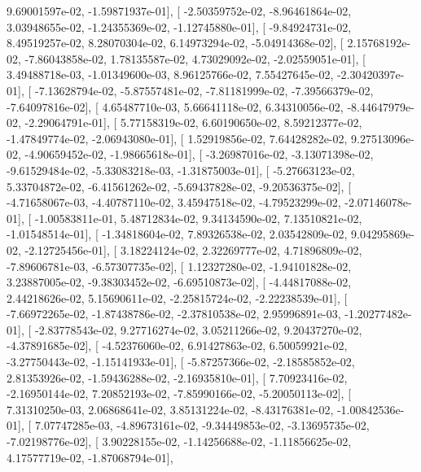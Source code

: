 \documentclass{article}
\begin{document}
          9.69001597e-02,  -1.59871937e-01],
       [ -2.50359752e-02,  -8.96461864e-02,   3.03948655e-02,
         -1.24355369e-02,  -1.12745880e-01],
       [ -9.84924731e-02,   8.49519257e-02,   8.28070304e-02,
          6.14973294e-02,  -5.04914368e-02],
       [  2.15768192e-02,  -7.86043858e-02,   1.78135587e-02,
          4.73029092e-02,  -2.02559051e-01],
       [  3.49488718e-03,  -1.01349600e-03,   8.96125766e-02,
          7.55427645e-02,  -2.30420397e-01],
       [ -7.13628794e-02,  -5.87557481e-02,  -7.81181999e-02,
         -7.39566379e-02,  -7.64097816e-02],
       [  4.65487710e-03,   5.66641118e-02,   6.34310056e-02,
         -8.44647979e-02,  -2.29064791e-01],
       [  5.77158319e-02,   6.60190650e-02,   8.59212377e-02,
         -1.47849774e-02,  -2.06943080e-01],
       [  1.52919856e-02,   7.64428282e-02,   9.27513096e-02,
         -4.90659452e-02,  -1.98665618e-01],
       [ -3.26987016e-02,  -3.13071398e-02,  -9.61529484e-02,
         -5.33083218e-03,  -1.31875003e-01],
       [ -5.27663123e-02,   5.33704872e-02,  -6.41561262e-02,
         -5.69437828e-02,  -9.20536375e-02],
       [ -4.71658067e-03,  -4.40787110e-02,   3.45947518e-02,
         -4.79523299e-02,  -2.07146078e-01],
       [ -1.00583811e-01,   5.48712834e-02,   9.34134590e-02,
          7.13510821e-02,  -1.01548514e-01],
       [ -1.34818604e-02,   7.89326538e-02,   2.03542809e-02,
          9.04295869e-02,  -2.12725456e-01],
       [  3.18224124e-02,   2.32269777e-02,   4.71896809e-02,
         -7.89606781e-03,  -6.57307735e-02],
       [  1.12327280e-02,  -1.94101828e-02,   3.23887005e-02,
         -9.38303452e-02,  -6.69510873e-02],
       [ -4.44817088e-02,   2.44218626e-02,   5.15690611e-02,
         -2.25815724e-02,  -2.22238539e-01],
       [ -7.66972265e-02,  -1.87438786e-02,  -2.37810538e-02,
          2.95996891e-03,  -1.20277482e-01],
       [ -2.83778543e-02,   9.27716274e-02,   3.05211266e-02,
          9.20437270e-02,  -4.37891685e-02],
       [ -4.52376060e-02,   6.91427863e-02,   6.50059921e-02,
         -3.27750443e-02,  -1.15141933e-01],
       [ -5.87257366e-02,  -2.18585852e-02,   2.81353926e-02,
         -1.59436288e-02,  -2.16935810e-01],
       [  7.70923416e-02,  -2.16950144e-02,   7.20852193e-02,
         -7.85990166e-02,  -5.20050113e-02],
       [  7.31310250e-03,   2.06868641e-02,   3.85131224e-02,
         -8.43176381e-02,  -1.00842536e-01],
       [  7.07747285e-03,  -4.89673161e-02,  -9.34449853e-02,
         -3.13695735e-02,  -7.02198776e-02],
       [  3.90228155e-02,  -1.14256688e-02,  -1.11856625e-02,
          4.17577719e-02,  -1.87068794e-01],
\end{document}
